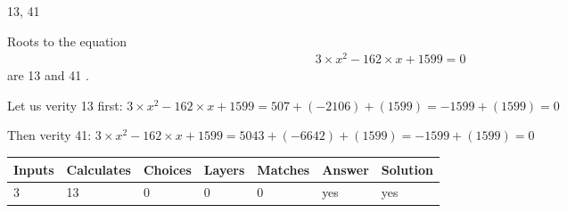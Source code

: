 \documentclass[12pt]{article}
\begin{document}
 

13,  %
41
 
 
 
\noindent{}
 
 

 
 
 
\noindent{}
 
 

Roots to the equation
\begin{eqnarray*}
3 \times x^2  %
-162
                 \times x    %
+  %
1599 =0
\end{eqnarray*}
are  %
13 and  %
41 .
 
Let us verity  %
13 first:
$  %
3 \times x^2  %
-162
                 \times x    %
+  %
1599
  = %
507+( %
-2106)+( %
1599)
  = %
-1599+( %
1599)
  = %
0
$
 
Then verity  %
41:
$  %
3 \times x^2  %
-162
                 \times x    %
+  %
1599
  = %
5043+( %
-6642)+( %
1599)
  = %
-1599+( %
1599)
  = %
0
$
 
 
 
\noindent{}
 
 

 
\vspace{0.3in}
   
   
   
   
\noindent\begin{tabular}{|l|l|l|l|l|l|l|}
 \hline
Inputs & Calculates & Choices & Layers & Matches & Answer & Solution \\ \hline
           3  & 
          13  & 
           0
  & 
           0  & 
           0  & 
  yes & 
  yes 
  \\ \hline
 \end{tabular}
   
   
   
   
\noindent{}
   
   
  
\end{document}
